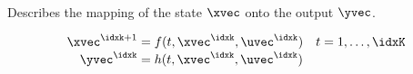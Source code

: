 \begin{defnbox}\nospacing
  \begin{defn}\label{defn:state_space_measurment_output_observation_model}\leavevmode\\
    Describes the mapping of the state $\xvec$ onto the output $\yvec$.
  \end{defn}
\end{defnbox}
\begin{defnbox}\nospacing
  \begin{defn}\label{defn:discrete_state_space_model}
    \begin{align}
      \xvec^{\idxk+1}&=f(t,\xvec^{\idxk},\uvec^{\idxk})&&t=1,\ldots,\idxK\\[-1\jot]
      \yvec^{\idxk}&=h(t,\xvec^{\idxk},\uvec^{\idxk})
    \end{align}
  \end{defn}
\end{defnbox}

